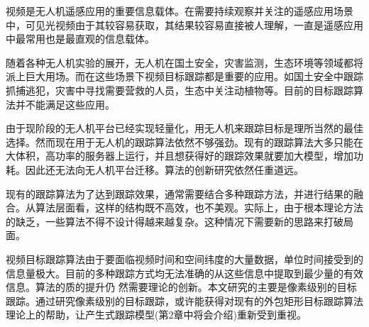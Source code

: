 \par
视频是无人机遥感应用的重要信息载体。在需要持续观察并关注的遥感应用场景中，可见光视频由于其较容易获取，其结果较容易直接被人理解，一直是遥感应用中最常用也是最直观的信息载体。
\par
随着各种无人机实验的展开，无人机在国土安全，灾害监测，生态环境等领域都将派上巨大用场。而在这些场景下视频目标跟踪都是重要的应用。如国土安全中跟踪抓捕逃犯，灾害中寻找需要营救的人员，生态中关注动植物等。目前的目标跟踪算法并不能满足这些应用。
\par
由于现阶段的无人机平台已经实现轻量化，用无人机来跟踪目标是理所当然的最佳选择。然而现在用于无人机的跟踪算法依然不够强劲。现有的跟踪算法大多只能在大体积，高功率的服务器上运行，并且想获得好的跟踪效果就要加大模型，增加功耗。因此还无法向无人机平台迁移。算法的创新研究依然任重道远。
\par
现有的跟踪算法为了达到跟踪效果，通常需要结合多种跟踪方法，并进行结果的融合。从算法层面看，这样的结构既不高效，也不美观。实际上，由于根本理论方法的缺乏，一些算法不得不设计得越来越复杂。这种情况下需要新的思路来打破局面。
\par
视频目标跟踪算法由于要面临视频时间和空间纬度的大量数据，单位时间接受到的信息量极大。目前的多种跟踪方式均无法准确的从这些信息中提取到最少量的有效信息。算法的质的提升仍 然需要理论的创新。本文研究的主要是像素级别的目标跟踪。通过研究像素级别的目标跟踪，或许能获得对现有的外包矩形目标跟踪算法理论上的帮助，让产生式跟踪模型(第2章中将会介绍)重新受到重视。

